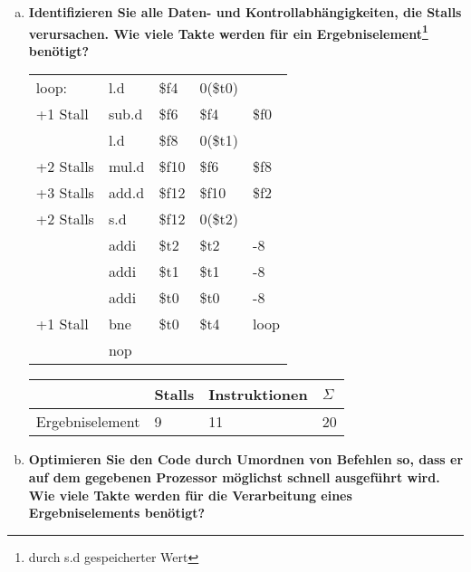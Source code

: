 \begin{enumerate}[(a)]
	\item \textbf{Identifizieren Sie alle Daten- und Kontrollabhängigkeiten, die Stalls verursachen. Wie viele Takte werden für ein Ergebniselement\footnote{durch s.d gespeicherter Wert} benötigt?}

	{
		\ttfamily
		\begin{tabular}{l llll}
			loop:                       & l.d   & \color{blue}\$f4        & 0(\$t0)               &                  \\
			\color{blue} +1 Stall       & sub.d & \color{brown}\$f6       & \color{blue}\$f4      & \$f0             \\
			                            & l.d   & \color{cyan}\$f8        & 0(\$t1)               &                  \\
			\color{brown}+2 Stalls      & mul.d & \color{Mulberry}\$f10   & \color{brown}\$f6     & \color{cyan}\$f8 \\
			\color{Mulberry}+3 Stalls   & add.d & \color{Orange}\$f12     & \color{Mulberry}\$f10 & \$f2             \\
			\color{Orange}+2 Stalls     & s.d   & \color{Orange}\$f12     & 0(\$t2)               &                  \\
			                            & addi  & \$t2                    & \$t2                  & -8               \\
			                            & addi  & \$t1                    & \$t1                  & -8               \\
			                            & addi  & \color{Bittersweet}\$t0 & \$t0                  & -8               \\
			\color{Bittersweet}+1 Stall & bne   & \color{Bittersweet}\$t0 & \$t4                  & loop             \\
			                            & nop   &                         &                       &
		\end{tabular}
	}
	\begin{tabular}{llll}
		\hline
		                & Stalls & Instruktionen & $ \Sigma $ \\ \hline
		Ergebniselement & 9      & 11            & 20         \\ \hline
	\end{tabular}

	\pagebreak	
	\item \textbf{Optimieren Sie den Code durch Umordnen von Befehlen so, dass er auf dem gegebenen Prozessor möglichst schnell ausgeführt wird. Wie viele Takte werden für die Verarbeitung eines Ergebniselements benötigt?}
	

\end{enumerate}
